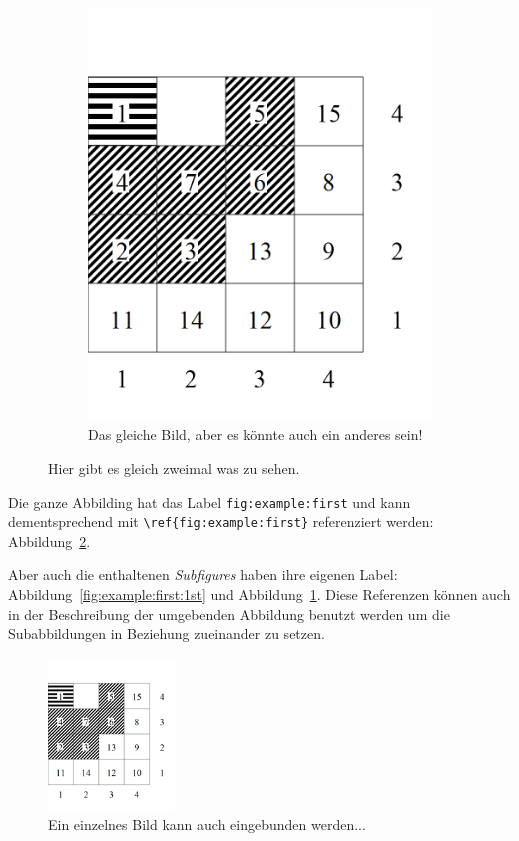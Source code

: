 \begin{figure}[htp]
\begin{subfigure}[t]{0.38\textwidth}
    \includegraphics[width=\textwidth]{img/pre-solving-bsp-1.png}
    \caption{Das gleiche Bild, aber es könnte auch ein anderes sein!}
    \label{fig:example:first:2nd}
  \end{subfigure}

  \caption{Hier gibt es gleich zweimal was zu sehen.}
  \label{fig:example:first}
\end{figure}

Die ganze Abbilding hat das Label \texttt{fig:example:first} und kann dementsprechend mit
\texttt{\textbackslash{}ref\{fig:example:first\}} referenziert werden:
Abbildung~\ref{fig:example:first}.

Aber auch die enthaltenen \emph{Subfigures} haben ihre eigenen Label:
Abbildung~\ref{fig:example:first:1st} und Abbildung~\ref{fig:example:first:2nd}.
Diese Referenzen können auch in der Beschreibung der umgebenden Abbildung
benutzt werden um die Subabbildungen in Beziehung zueinander zu setzen.

\begin{figure}[htp]
  \centering
  \includegraphics[width=0.3\textwidth]{img/pre-solving-bsp-1.png}
  \caption{Ein einzelnes Bild kann auch eingebunden werden...}
  \label{fig:einzeln}
\end{figure}


